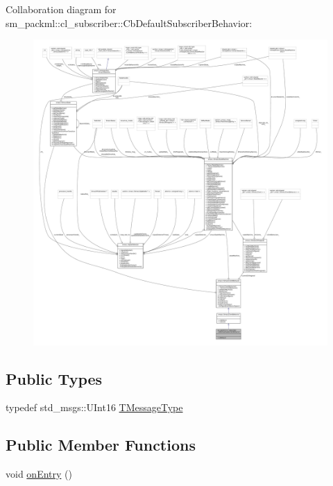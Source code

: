 Collaboration diagram for sm\+\_\+packml\+:\+:cl\+\_\+subscriber\+:\+:Cb\+Default\+Subscriber\+Behavior\+:
\nopagebreak
\begin{figure}[H]
\begin{center}
\leavevmode
\includegraphics[width=350pt]{classsm__packml_1_1cl__subscriber_1_1CbDefaultSubscriberBehavior__coll__graph}
\end{center}
\end{figure}
\subsection*{Public Types}
\begin{DoxyCompactItemize}
\item 
typedef std\+\_\+msgs\+::\+U\+Int16 \hyperlink{classsm__packml_1_1cl__subscriber_1_1CbDefaultSubscriberBehavior_a872930a0cb627bfd0ba2db51d7c5334a}{T\+Message\+Type}
\end{DoxyCompactItemize}
\subsection*{Public Member Functions}
\begin{DoxyCompactItemize}
\item 
void \hyperlink{classsm__packml_1_1cl__subscriber_1_1CbDefaultSubscriberBehavior_abee6ee854163b3724cd9010bc474592e}{on\+Entry} ()
\end{DoxyCompactItemize}
